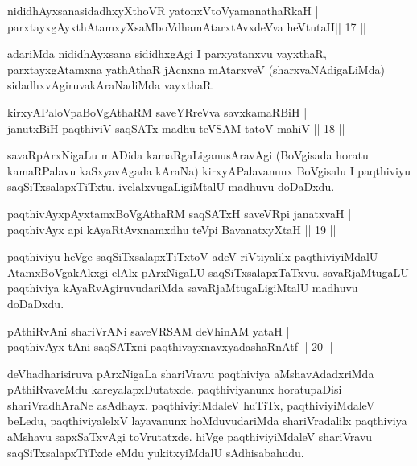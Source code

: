 \begin{shl}
nididhAyxsanasidadhxyXthoVR yatonxV\s toV\s yamanathaRkaH |\\
parxtayxgAyxthAtamxyXsaMboVdhamAtarxtAvxdeVva heVtutaH\hfill || 17 ||
\end{shl}

\begin{artha}
adariMda nididhAyxsana sididhxgAgi I parxyatanxvu vayxthaR, parxtayxgAtamxna yathAthaR jAcnxna mAtarxveV (sharxvaNAdigaLiMda) sidadhxvAgiruvakAraNadiMda vayxthaR.
\end{artha}

\begin{shl}
kirxyAPaloVpaBoVgAthaRM saveYRreVva savxkamaRBiH |\\
janutxBiH paqthiviV saqSATx madhu teVSAM tatoV mahiV \hfill || 18 || 
\end{shl}
\begin{artha}
savaRpArxNigaLu mADida kamaRgaLiganusAravAgi (BoVgisada horatu kamaRPalavu kaSxyavAgada kAraNa) kirxyAPalavanunx BoVgisalu I paqthiviyu saqSiTxsalapxTiTxtu. ivelalxvugaLigiMtalU madhuvu doDaDxdu.
\end{artha}
\begin{shl}
paqthivAyx\s pAyxtamxBoVgAthaRM saqSATxH saveVR\s pi janatxvaH |\\
paqthivAyx api kAyaRtAvxnamxdhu teV\s pi BavanatxyXtaH \hfill || 19 ||
\end{shl}
\begin{artha}
paqthiviyu heVge saqSiTxsalapxTiTxtoV adeV riVtiyalilx paqthiviyiMdalU AtamxBoVgakAkxgi elAlx pArxNigaLU saqSiTxsalapxTaTxvu. savaRjaMtugaLU paqthiviya kAyaRvAgiruvudariMda savaRjaMtugaLigiMtalU madhuvu doDaDxdu.
\end{artha}
\begin{shl}
pAthiRvAni shariVrANi saveVRSAM deVhinAM yataH |\\
paqthivAyx tAni saqSATxni paqthivayxnavxyadashaRnAtf \hfill  || 20 || 
\end{shl}
\begin{artha}
deVhadharisiruva pArxNigaLa shariVravu paqthiviya aMshavAdadxriMda pAthiRvaveMdu kareyalapxDutatxde. paqthiviyanunx horatupaDisi shariVradhAraNe asAdhayx. paqthiviyiMdaleV huTiTx, paqthiviyiMdaleV beLedu,  paqthiviyalelxV layavanunx hoMduvudariMda shariVradalilx paqthiviya aMshavu sapxSaTxvAgi toVrutatxde. hiVge paqthiviyiMdaleV shariVravu saqSiTxsalapxTiTxde eMdu yukitxyiMdalU sAdhisabahudu.  
\end{artha}
